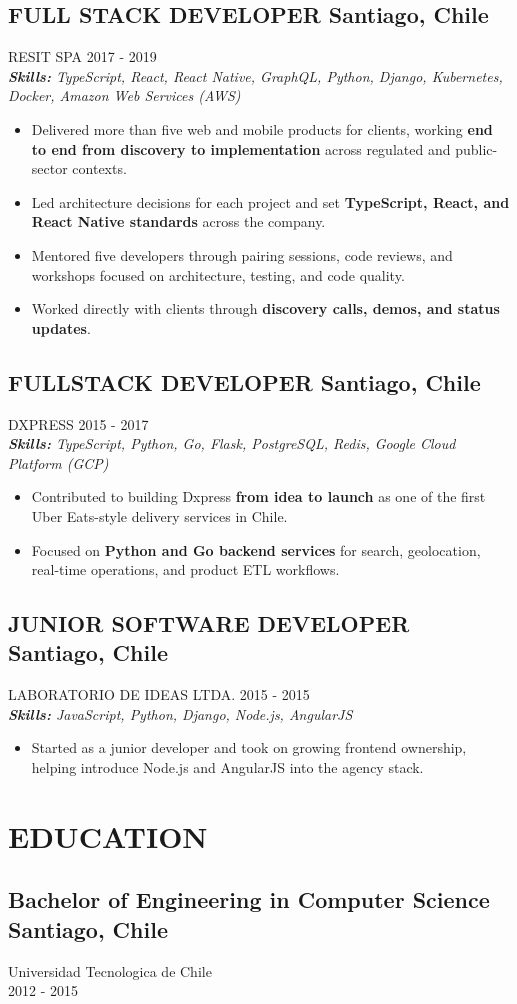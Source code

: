 \documentclass{article}
\newcommand{\SubHeading}[1]{
   \subsection*{#1}\vspace{-0.5em}
}
\newcommand{\WorkExperience}[2]{
   \subsection*{#1}
   \vspace{-1em}
   \uppercase{#2}
}
\newcommand{\Skills}[1]{
   \textit{\textbf{Skills:} #1}
}
\begin{document}
\WorkExperience{FULL STACK DEVELOPER \hfill Santiago, Chile}{Resit SPA \hfill 2017 {-} 2019} \\
\Skills{TypeScript, React, React Native, GraphQL, Python, Django, Kubernetes, Docker, Amazon Web Services (AWS)}
\begin{itemize}
	\item Delivered more than five web and mobile products for clients, working \textbf{end to end from discovery to implementation} across regulated and public-sector contexts.
	\item Led architecture decisions for each project and set \textbf{TypeScript, React, and React Native standards} across the company.
	\item Mentored five developers through pairing sessions, code reviews, and workshops focused on architecture, testing, and code quality.
	\item Worked directly with clients through \textbf{discovery calls, demos, and status updates}.
\end{itemize}

\WorkExperience{FULLSTACK DEVELOPER \hfill Santiago, Chile}{Dxpress \hfill 2015 {-} 2017} \\
\Skills{TypeScript, Python, Go, Flask, PostgreSQL, Redis, Google Cloud Platform (GCP)}
\begin{itemize}
	\item Contributed to building Dxpress \textbf{from idea to launch} as one of the first Uber Eats-style delivery services in Chile.
	\item Focused on \textbf{Python and Go backend services} for search, geolocation, real-time operations, and product ETL workflows.
\end{itemize}

\WorkExperience{JUNIOR SOFTWARE DEVELOPER \hfill Santiago, Chile}{Laboratorio de Ideas Ltda. \hfill 2015 {-} 2015} \\
\Skills{JavaScript, Python, Django, Node.js, AngularJS}
\begin{itemize}
	\item Started as a junior developer and took on growing frontend ownership, helping introduce Node.js and AngularJS into the agency stack.
\end{itemize}

\section*{EDUCATION}
\SubHeading{Bachelor of Engineering in Computer Science \hfill Santiago, Chile}
Universidad Tecnologica de Chile \\[0.1em]
2012 {-} 2015
\end{document}
